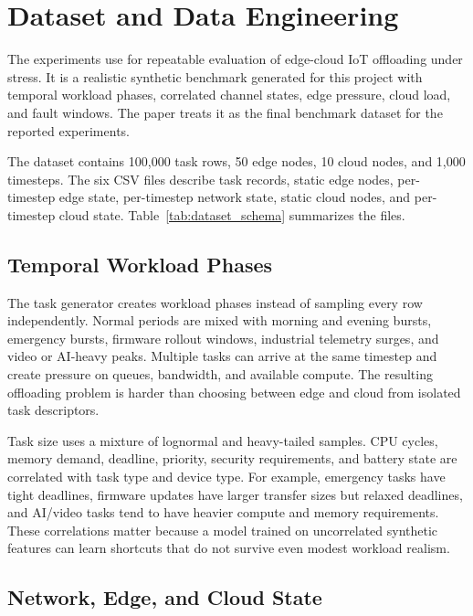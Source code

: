 \section{Dataset and Data Engineering}
\label{sec:dataset}

The experiments use \dataset{} for repeatable evaluation of edge-cloud IoT offloading under stress. It is a realistic synthetic benchmark generated for this project with temporal workload phases, correlated channel states, edge pressure, cloud load, and fault windows. The paper treats it as the final benchmark dataset for the reported experiments.

The dataset contains 100,000 task rows, 50 edge nodes, 10 cloud nodes, and 1,000 timesteps. The six CSV files describe task records, static edge nodes, per-timestep edge state, per-timestep network state, static cloud nodes, and per-timestep cloud state. Table~\ref{tab:dataset_schema} summarizes the files.




\subsection{Temporal Workload Phases}

The task generator creates workload phases instead of sampling every row independently. Normal periods are mixed with morning and evening bursts, emergency bursts, firmware rollout windows, industrial telemetry surges, and video or AI-heavy peaks. Multiple tasks can arrive at the same timestep and create pressure on queues, bandwidth, and available compute. The resulting offloading problem is harder than choosing between edge and cloud from isolated task descriptors.

Task size uses a mixture of lognormal and heavy-tailed samples. CPU cycles, memory demand, deadline, priority, security requirements, and battery state are correlated with task type and device type. For example, emergency tasks have tight deadlines, firmware updates have larger transfer sizes but relaxed deadlines, and AI/video tasks tend to have heavier compute and memory requirements. These correlations matter because a model trained on uncorrelated synthetic features can learn shortcuts that do not survive even modest workload realism.

\subsection{Network, Edge, and Cloud State}


